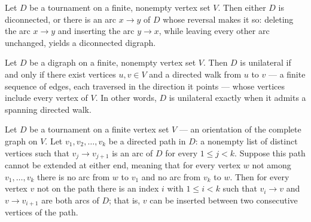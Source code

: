 \begin{theorem}
\label{tournament_diconnected_or_reorient_one}
\leanok
{}
Let $D$ be a tournament on a finite, nonempty vertex set $V$. Then either $D$ is
diconnected, or there is an arc $x \to y$ of $D$ whose reversal makes it so: deleting
the arc $x \to y$ and inserting the arc $y \to x$, while leaving every other arc
unchanged, yields a diconnected digraph.
\end{theorem}

\begin{theorem}
\label{isUnilateral_iff_exists_spanning_directedWalk}
\leanok
{}
Let $D$ be a digraph on a finite, nonempty vertex set $V$. Then $D$ is unilateral if and
only if there exist vertices $u, v \in V$ and a directed walk from $u$ to $v$ — a finite
sequence of edges, each traversed in the direction it points — whose vertices include
every vertex of $V$. In other words, $D$ is unilateral exactly when it admits a spanning
directed walk.
\end{theorem}

\begin{theorem}
\label{tournament_maximal_directedPath_insert}
\leanok
{}
Let $D$ be a tournament on a finite vertex set $V$ — an orientation of the complete
graph on $V$. Let $v_1, v_2, \dots, v_k$ be a directed path in $D$: a nonempty list of
distinct vertices such that $v_j \to v_{j+1}$ is an arc of $D$ for every $1 \le j < k$.
Suppose this path cannot be extended at either end, meaning that for every vertex $w$
not among $v_1, \dots, v_k$ there is no arc from $w$ to $v_1$ and no arc from $v_k$ to
$w$. Then for every vertex $v$ not on the path there is an index $i$ with $1 \le i < k$
such that $v_i \to v$ and $v \to v_{i+1}$ are both arcs of $D$; that is, $v$ can be
inserted between two consecutive vertices of the path.
\end{theorem}

